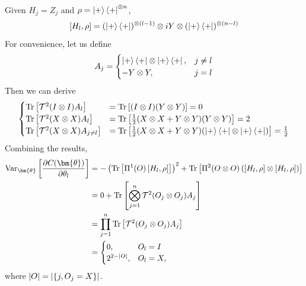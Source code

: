 \documentclass[a4paper,onecolumn,notitlepage,nofootinbib,longbibliography,superscriptaddress, floatfix, pra, aps, 10pt]{revtex4-2}
\newcommand{\vttheta}{{\bm{\theta}}}
\begin{document}
Given $H_j = Z_j$ and $\rho = \ket{+}\bra{+}^{\otimes n}$,
\begin{equation}
    \comm{H_l}{\rho} = (\ket{+}\bra{+})^{\otimes (l-1)} \otimes iY \otimes (\ket{+}\bra{+})^{\otimes (n-l)} 
\end{equation}
For convenience, let us define \begin{equation}
    A_j = \begin{cases}
        \ket{+}\bra{+} \otimes \ket{+}\bra{+}, & j \neq l \\
        -Y\otimes Y, & j=l
    \end{cases}
\end{equation}
Then we can derive
\begin{align}
\begin{cases}
    \Tr \left[\mathcal{T}^2(I \otimes I) A_l \right] &= \Tr \left[(I \otimes I) (Y\otimes Y) \right] = 0 \\
    \Tr \left[\mathcal{T}^2(X \otimes X) A_l \right] &= \Tr \left[\frac{1}{2} (X \otimes X + Y \otimes Y) (Y\otimes Y) \right] = 2 \\
    \Tr \left[\mathcal{T}^2(X \otimes X) A_{j \neq l} \right] &= \Tr \left[\frac{1}{2} (X \otimes X + Y \otimes Y)  (\ket{+}\bra{+} \otimes \ket{+}\bra{+}) \right] = \frac{1}{2}
    \end{cases}
\end{align}
Combining the results, 
\begin{align}
\text{Var}_\vttheta \left[\frac{\partial C(\vttheta)}{\partial {\theta_l}}\right] &= - \left(\Tr\left[\Pi^1(O)\left[H_l,\rho\right]  \right]\right)^2 + \Tr\left[\Pi^2(O\otimes O) \left(\left[H_l,\rho\right] \otimes \left[H_l,\rho\right] \right)\right] \\
&= 0 + \Tr\left[\bigotimes_{j=1}^n\mathcal{T}^2(O_j \otimes O_j) A_j\right] \\
& = \prod_{j=1}^n \Tr\left[\mathcal{T}^2(O_j \otimes O_j) A_j\right]  \\
&= \begin{cases}
    0, & O_l = I \\
    2^{2-\abs{O}}, & O_l = X,
\end{cases}
\end{align}
where $\abs{O} = \abs{\{j, O_j=X\}}$.
\end{document}
